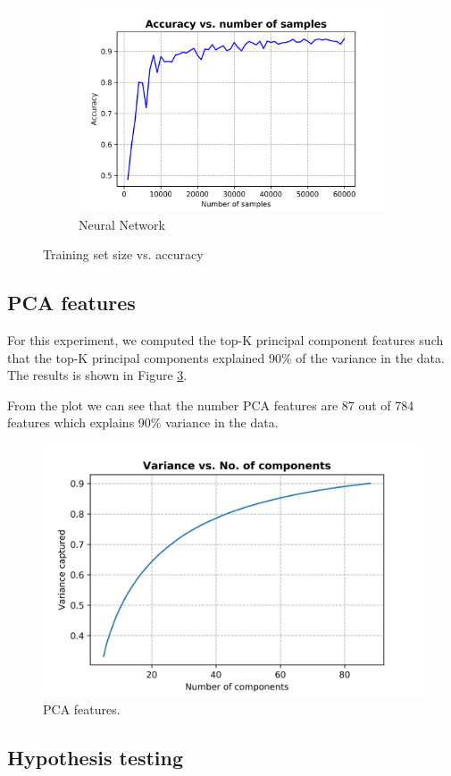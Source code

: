 \documentclass[10pt]{scrartcl}
\begin{document}
\begin{figure}[H]
\begin{subfigure}{0.4\linewidth}
		\includegraphics[width=1\linewidth]{figures/accuracy_vs_samples_neural_net_default}
		\caption{Neural Network}\label{fig:1b}
	\end{subfigure}
	\caption{Training set size vs. accuracy}\label{fig:1}
\end{figure}

\subsection*{PCA features}
For this experiment, we computed the top-K principal component features such that the top-K principal components explained 90\% of the variance in the data. 
The results is shown in Figure \ref{fig:pca_features}.

From the plot we can see that the number PCA features are 87 out of 784 features which explains 90\% variance in the data.
\begin{figure}[H]
\centering
\includegraphics[width=0.5\linewidth]{figures/pca_variance_vs_no_comp.png}
\caption{PCA features. \label{fig:pca_features}}
\end{figure}

\subsection*{Hypothesis testing}
\end{document}

